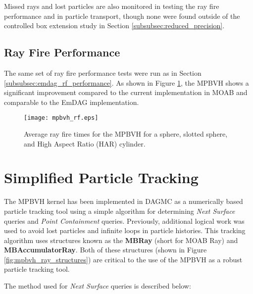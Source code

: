 Missed rays and lost particles are also monitored in testing the ray fire
performance and in particle transport, though none were found outside of the
controlled box extension study in Section \ref{subsubsec:reduced_precision}.

\subsection{Ray Fire Performance}\label{sec:mpbvh_rf_perf}

The same set of ray fire performance tests were run as in Section
\ref{subsubsec:emdag_rf_performance}. As shown in Figure
\ref{fig:mpbvh_rf_tests}, the MPBVH shows a significant improvement compared to
the current implementation in MOAB and comparable to the EmDAG implementation.

\begin{figure}[H]
  \centering
  \texttt{[image: mpbvh\_rf.eps]}
  \caption{Average ray fire times for the MPBVH for a sphere, slotted sphere, and High Aspect Ratio (HAR) cylinder.}
  \label{fig:mpbvh_rf_tests}
\end{figure}

\section{Simplified Particle Tracking}

The MPBVH kernel has been implemented in DAGMC as a numerically based particle
tracking tool using a simple algorithm for determining \textit{Next Surface}
queries and \textit{Point Containment} queries. Previously, additional logical
work was used to avoid lost particles and infinite loops in particle
histories. This tracking algorithm uses structures known as the \textbf{MBRay}
(short for MOAB Ray) and \textbf{MBAccumulatorRay}. Both of these structures
(shown in Figure \ref{fig:mpbvh_ray_structures}) are critical to the use of the
MPBVH as a robust particle tracking tool.

The method used for \textit{Next Surface} queries is described below:

